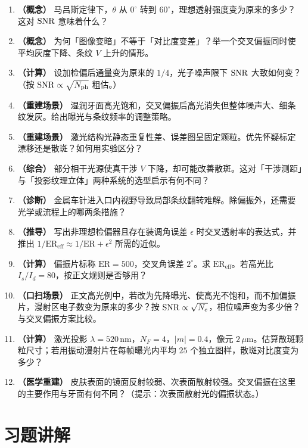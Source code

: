 \begin{enumerate}
  \item \textbf{（概念）} 马吕斯定律下，$\theta$ 从 $0^\circ$ 转到 $60^\circ$，理想透射强度变为原来的多少？这对 $\mathrm{SNR}$ 意味着什么？
  \item \textbf{（概念）} 为何「图像变暗」不等于「对比度变差」？举一个交叉偏振同时使平均灰度下降、条纹 $V$ 上升的情形。
  \item \textbf{（计算）} 设加检偏后通量变为原来的 $1/4$，光子噪声限下 $\mathrm{SNR}$ 大致如何变？（按 $\mathrm{SNR}\propto\sqrt{N_{\mathrm{ph}}}$ 粗估。）
  \item \textbf{（重建场景）} 湿润牙面高光饱和，交叉偏振后高光消失但整体噪声大、细条纹发灰。给出曝光与条纹频率的调整策略。
  \item \textbf{（重建场景）} 激光结构光静态重复性差、误差图呈固定颗粒。优先怀疑标定漂移还是散斑？如何用实验区分？
  \item \textbf{（综合）} 部分相干光源使真干涉 $V$ 下降，却可能改善散斑。这对「干涉测距」与「投影纹理立体」两种系统的选型启示有何不同？
  \item \textbf{（诊断）} 金属车针进入口内视野导致局部条纹翻转难解。除偏振外，还需要光学或流程上的哪两条措施？
  \item \textbf{（推导）} 写出非理想检偏器且存在装调角误差 $\epsilon$ 时交叉透射率的表达式，并推出 $1/\mathrm{ER}_{\mathrm{eff}}\approx1/\mathrm{ER}+\epsilon^2$ 所需的近似。
  \item \textbf{（计算）} 偏振片标称 $\mathrm{ER}=500$，交叉角误差 $2^\circ$。求 $\mathrm{ER}_{\mathrm{eff}}$。若高光比 $I_s/I_d=80$，按正文规则是否够用？
  \item \textbf{（口扫场景）} 正文高光例中，若改为先降曝光、使高光不饱和，而不加偏振片，漫射区电子数变为原来的多少？按 $\mathrm{SNR}\propto\sqrt{N_e}$，相位噪声变为多少倍？与交叉偏振方案比较。
  \item \textbf{（计算）} 激光投影 $\lambda=520\,\mathrm{nm}$，$N_F=4$，$|m|=0.4$，像元 $2\,\mu\mathrm{m}$。估算散斑颗粒尺寸；若用振动漫射片在每帧曝光内平均 $25$ 个独立图样，散斑对比度变为多少？
  \item \textbf{（医学重建）} 皮肤表面的镜面反射较弱、次表面散射较强。交叉偏振在这里的主要作用与牙面有何不同？（提示：次表面散射光的偏振状态。）
\end{enumerate}

\section{习题讲解}
\label{sec:ch04-solutions}

